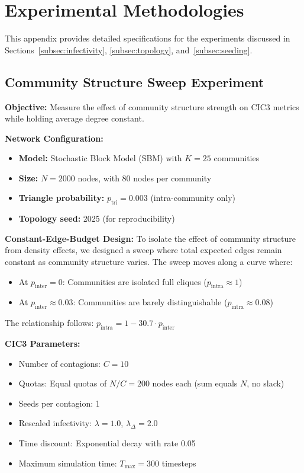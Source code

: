 \documentclass[sigconf]{acmart}
\begin{document}
\appendix

\section{Experimental Methodologies}
\label{app:methodologies}

This appendix provides detailed specifications for the experiments discussed in Sections~\ref{subsec:infectivity}, \ref{subsec:topology}, and~\ref{subsec:seeding}.

\subsection{Community Structure Sweep Experiment}
\label{app:community}

\textbf{Objective:} Measure the effect of community structure strength on CIC3 metrics while holding average degree constant.

\textbf{Network Configuration:}
\begin{itemize}
    \item \textbf{Model:} Stochastic Block Model (SBM) with $K=25$ communities
    \item \textbf{Size:} $N=2000$ nodes, with 80 nodes per community
    \item \textbf{Triangle probability:} $p_{\text{tri}} = 0.003$ (intra-community only)
    \item \textbf{Topology seed:} 2025 (for reproducibility)
\end{itemize}

\textbf{Constant-Edge-Budget Design:}
To isolate the effect of community structure from density effects, we designed a sweep where total expected edges remain constant as community structure varies. The sweep moves along a curve where:
\begin{itemize}
    \item At $p_{\text{inter}} = 0$: Communities are isolated full cliques ($p_{\text{intra}} \approx 1$)
    \item At $p_{\text{inter}} \approx 0.03$: Communities are barely distinguishable ($p_{\text{intra}} \approx 0.08$)
\end{itemize}

The relationship follows: $p_{\text{intra}} = 1 - 30.7 \cdot p_{\text{inter}}$

\textbf{CIC3 Parameters:}
\begin{itemize}
    \item Number of contagions: $C=10$
    \item Quotas: Equal quotas of $N/C = 200$ nodes each (sum equals $N$, no slack)
    \item Seeds per contagion: 1
    \item Rescaled infectivity: $\lambda = 1.0$, $\lambda_{\Delta} = 2.0$
    \item Time discount: Exponential decay with rate 0.05
    \item Maximum simulation time: $T_{\text{max}} = 300$ timesteps
\end{itemize}
\end{document}
